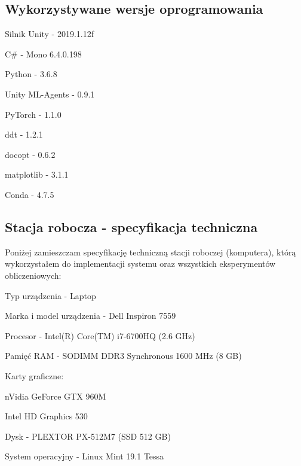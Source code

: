 \subsection{Wykorzystywane wersje oprogramowania}
\begin{enumerate*}
\item Silnik Unity - 2019.1.12f
\item C\# - Mono 6.4.0.198
\item Python - 3.6.8
\item Unity ML-Agents - 0.9.1
\item PyTorch - 1.1.0
\item ddt - 1.2.1
\item docopt - 0.6.2
\item matplotlib - 3.1.1
\item Conda - 4.7.5
\end{enumerate*}

\subsection{Stacja robocza - specyfikacja techniczna}
Poniżej zamieszczam specyfikację techniczną stacji roboczej (komputera), którą wykorzystałem do implementacji systemu oraz wszystkich eksperymentów obliczeniowych:
\begin{enumerate*}
\item Typ urządzenia - Laptop
\item Marka i model urządzenia - Dell Inspiron 7559
\item Procesor - Intel(R) Core(TM) i7-6700HQ (2.6 GHz)
\item Pamięć RAM - SODIMM DDR3 Synchronous 1600 MHz (8 GB)
\item Karty graficzne:
\begin{itemize*}
\item nVidia GeForce GTX 960M
\item Intel HD Graphics 530
\end{itemize*}
\item Dysk - PLEXTOR PX-512M7 (SSD 512 GB)
\item System operacyjny - Linux Mint 19.1 Tessa
\end{enumerate*}
